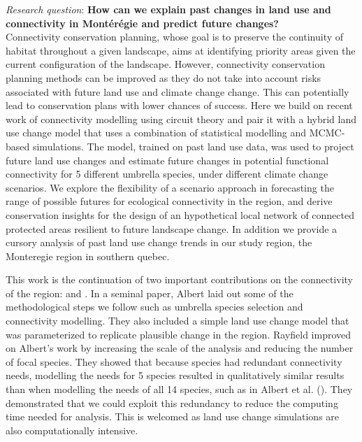 \textit{Research question}: \textbf{How can we explain past changes in land use and connectivity in Montérégie and predict future changes?}\\

Connectivity conservation planning, whose goal is to preserve the continuity of habitat throughout a given landscape, aims at identifying priority areas given the current configuration of the landscape. However, connectivity conservation planning methods can be improved as they do not take into account risks associated with future land use and climate change change. This can potentially lead to conservation plans with lower chances of success. Here we build on recent work of connectivity modelling using circuit theory and pair it with a hybrid land use change model that uses a combination of statistical modelling and MCMC-based simulations. The model, trained on past land use data, was used to project future land use changes and estimate future changes in potential functional connectivity for 5 different umbrella species, under different climate change scenarios. We explore the flexibility of a scenario approach in forecasting the range of possible futures for ecological connectivity in the region, and derive conservation insights for the design of an hypothetical local network of connected protected areas resilient to future landscape change. In addition we provide a cursory analysis of past land use change trends in our study region, the Monteregie region in southern quebec. 

This work is the continuation of two important contributions on the connectivity of the region: \cite{albert_applying_2017} and \citep{rayfield_priorisation_2018}. In a seminal paper, Albert laid out some of the methodological steps we follow such as umbrella species selection and connectivity modelling. They also included a simple land use change model that was parameterized to replicate plausible change in the region. Rayfield improved on Albert’s work by increasing the scale of the analysis and reducing the number of focal species. They showed that because species had redundant connectivity needs, modelling the needs for 5 species resulted in qualitatively similar results than when modelling the needs of all 14 species, such as in Albert et al. (\citeyear{albert_applying_2017}). They demonstrated that we could exploit this redundancy to reduce the computing time needed for analysis. This is welcomed as land use change simulations are also computationally intensive.

